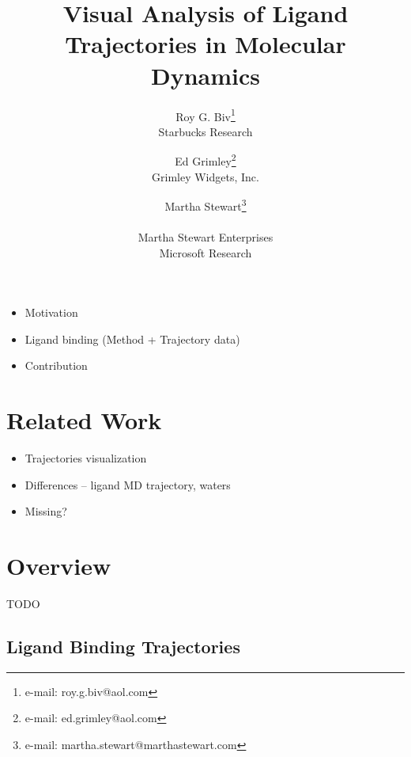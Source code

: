 \documentclass{vgtc}                          %
\title{Visual Analysis of Ligand Trajectories in Molecular Dynamics}
\author{Roy G. Biv\thanks{e-mail: roy.g.biv@aol.com}\\ %
        \scriptsize Starbucks Research %
\and Ed Grimley\thanks{e-mail: ed.grimley@aol.com}\\ %
     \scriptsize Grimley Widgets, Inc. %
\and Martha Stewart\thanks{e-mail: martha.stewart@marthastewart.com}\\ %
     \parbox{1.4in}{\scriptsize \centering Martha Stewart Enterprises \\ Microsoft Research}}
\begin{document}


\maketitle

\begin{itemize}
  \item Motivation
  \item Ligand binding (Method + Trajectory data)
  \item Contribution
\end{itemize}

\section{Related Work}

\begin{itemize}
  \item Trajectories visualization
  \item Differences -- ligand MD trajectory, waters
  \item Missing?
\end{itemize}

\section{Overview}

TODO

\subsection{Ligand Binding Trajectories}
\end{document}
